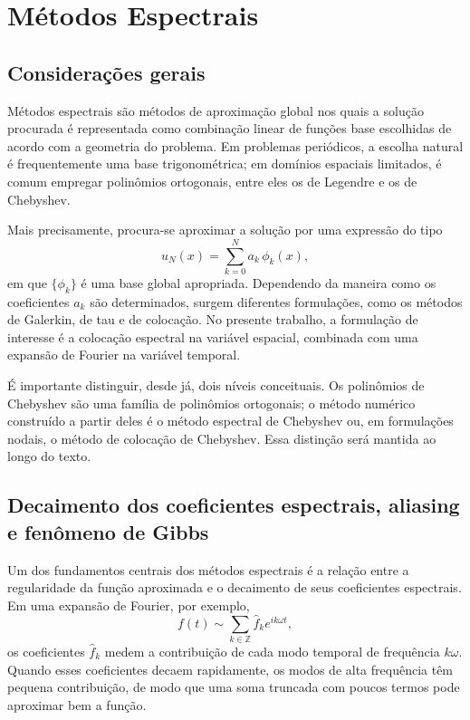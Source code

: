 \chapter{Métodos Espectrais}

\section{Considerações gerais}

Métodos espectrais são métodos de aproximação global nos quais a solução procurada é representada como combinação linear de funções base escolhidas de acordo com a geometria do problema. Em problemas periódicos, a escolha natural é frequentemente uma base trigonométrica; em domínios espaciais limitados, é comum empregar polinômios ortogonais, entre eles os de Legendre e os de Chebyshev.

Mais precisamente, procura-se aproximar a solução por uma expressão do tipo
\[
u_N(x)=\sum_{k=0}^{N} a_k \,\phi_k(x),
\]
em que \(\{\phi_k\}\) é uma base global apropriada. Dependendo da maneira como os coeficientes \(a_k\) são determinados, surgem diferentes formulações, como os métodos de Galerkin, de tau e de colocação. No presente trabalho, a formulação de interesse é a colocação espectral na variável espacial, combinada com uma expansão de Fourier na variável temporal.

É importante distinguir, desde já, dois níveis conceituais. Os polinômios de Chebyshev são uma família de polinômios ortogonais; o método numérico construído a partir deles é o método espectral de Chebyshev ou, em formulações nodais, o método de colocação de Chebyshev. Essa distinção será mantida ao longo do texto.



\section{Decaimento dos coeficientes espectrais, aliasing e fenômeno de Gibbs}
\label{sec:decaimento-aliasing-gibbs}

Um dos fundamentos centrais dos métodos espectrais é a relação entre a regularidade da função aproximada e o decaimento de seus coeficientes espectrais. Em uma expansão de Fourier, por exemplo,
\[
f(t)\sim \sum_{k\in\mathbb{Z}}\widehat{f}_k e^{ik\omega t},
\]
os coeficientes \(\widehat{f}_k\) medem a contribuição de cada modo temporal de frequência \(k\omega\). Quando esses coeficientes decaem rapidamente, os modos de alta frequência têm pequena contribuição, de modo que uma soma truncada com poucos termos pode aproximar bem a função.

